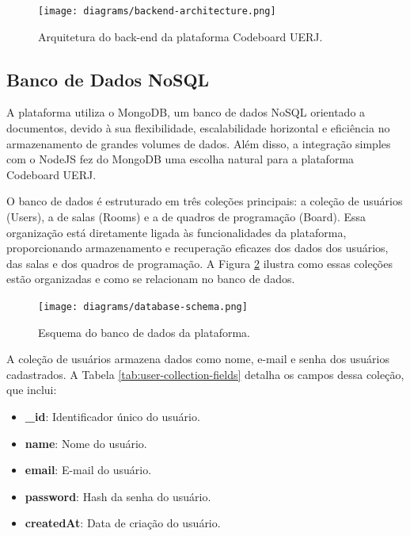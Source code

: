 \begin{figure}[H]
    \centering
    \caption{Arquitetura do back-end da plataforma Codeboard UERJ.}
    \label{fig:backend-architecture}
    \texttt{[image: diagrams/backend-architecture.png]}
\end{figure}


\subsection{Banco de Dados NoSQL}

A plataforma utiliza o MongoDB, um banco de dados NoSQL orientado a documentos, devido à sua flexibilidade, escalabilidade horizontal e eficiência no armazenamento de grandes volumes de dados. Além disso, a integração simples com o NodeJS fez do MongoDB uma escolha natural para a plataforma Codeboard UERJ.

O banco de dados é estruturado em três coleções principais: a coleção de usuários (Users), a de salas (Rooms) e a de quadros de programação (Board). Essa organização está diretamente ligada às funcionalidades da plataforma, proporcionando armazenamento e recuperação eficazes dos dados dos usuários, das salas e dos quadros de programação. A Figura \ref{fig:database-schema} ilustra como essas coleções estão organizadas e como se relacionam no banco de dados.

\begin{figure}[H]
    \centering
    \caption{Esquema do banco de dados da plataforma.}
    \label{fig:database-schema}
    \texttt{[image: diagrams/database-schema.png]}
\end{figure}

A coleção de usuários armazena dados como nome, e-mail e senha dos usuários cadastrados. A Tabela \ref{tab:user-collection-fields} detalha os campos dessa coleção, que inclui:

\begin{itemize}
    \item \textbf{\_id}: Identificador único do usuário.
    \item \textbf{name}: Nome do usuário.
    \item \textbf{email}: E-mail do usuário.
    \item \textbf{password}: Hash da senha do usuário.
    \item \textbf{createdAt}: Data de criação do usuário.
\end{itemize}

